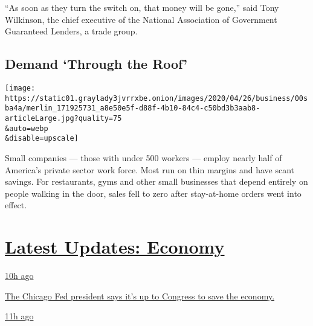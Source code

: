 ``As soon as they turn the switch on, that money will be gone,'' said
Tony Wilkinson, the chief executive of the National Association of
Government Guaranteed Lenders, a trade group.

\hypertarget{demand-through-the-roof}{%
\subsection{Demand `Through the Roof'}\label{demand-through-the-roof}}

\texttt{[image: https://static01.graylady3jvrrxbe.onion/images/2020/04/26/business/00sba4a/merlin\_171925731\_a8e50e5f-d88f-4b10-84c4-c50bd3b3aab8-articleLarge.jpg?quality=75\\\&auto=webp\\\&disable=upscale]}

Small companies --- those with under 500 workers --- employ nearly half
of America's private sector work force. Most run on thin margins and
have scant savings. For restaurants, gyms and other small businesses
that depend entirely on people walking in the door, sales fell to zero
after stay-at-home orders went into effect.

\hypertarget{latest-updates-economy}{%
\section{\texorpdfstring{\href{https://www.nytimes3xbfgragh.onion/live/2020/08/03/business/stock-market-today-coronavirus?action=click\&pgtype=Article\&state=default\&region=MAIN_CONTENT_1\&context=storylines_live_updates}{Latest
Updates:
Economy}}{Latest Updates: Economy}}\label{latest-updates-economy}}

\href{https://www.nytimes3xbfgragh.onion/live/2020/08/03/business/stock-market-today-coronavirus?action=click\&pgtype=Article\&state=default\&region=MAIN_CONTENT_1\&context=storylines_live_updates\#the-chicago-fed-president-says-its-up-to-congress-to-save-the-economy}{10h
ago}

\href{https://www.nytimes3xbfgragh.onion/live/2020/08/03/business/stock-market-today-coronavirus?action=click\&pgtype=Article\&state=default\&region=MAIN_CONTENT_1\&context=storylines_live_updates\#the-chicago-fed-president-says-its-up-to-congress-to-save-the-economy}{The
Chicago Fed president says it's up to Congress to save the economy.}

\href{https://www.nytimes3xbfgragh.onion/live/2020/08/03/business/stock-market-today-coronavirus?action=click\&pgtype=Article\&state=default\&region=MAIN_CONTENT_1\&context=storylines_live_updates\#faa-says-boeing-has-effectively-mitigated-defects-in-the-737-max}{11h
ago}

